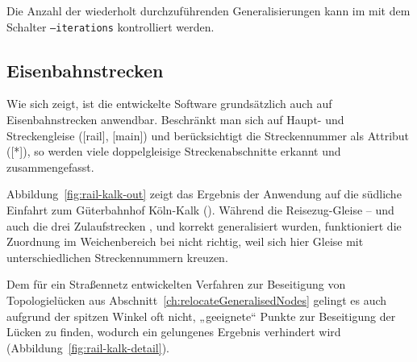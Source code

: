 \documentclass[../main/thesis.tex]{subfiles}
\begin{document}

Die Anzahl der wiederholt durchzuführenden Generalisierungen kann im  mit dem Schalter \texttt{--iterations} kontrolliert werden.




\subsection{Eisenbahnstrecken}
\label{ch:result-railways}

Wie sich zeigt, ist die entwickelte Software grundsätzlich auch auf Eisenbahnstrecken anwendbar.
Beschränkt man sich auf Haupt- und Streckengleise ([rail], [main]) und berücksichtigt die Streckennummer als Attribut ([*]), so werden viele doppelgleisige Streckenabschnitte erkannt und zusammengefasst.

Abbildung~\ref{fig:rail-kalk-out} zeigt das Ergebnis der Anwendung auf die südliche Einfahrt zum Güterbahnhof Köln-Kalk ().
Während die Reisezug-Gleise -- und auch die drei Zulaufstrecken ,  und  korrekt generalisiert wurden, funktioniert die Zuordnung im Weichenbereich bei  nicht richtig, weil sich hier Gleise mit unterschiedlichen Streckennummern kreuzen.

Dem für ein Straßennetz entwickelten Verfahren zur Beseitigung von Topologielücken aus Abschnitt~\ref{ch:relocateGeneralisedNodes} gelingt es auch aufgrund der spitzen Winkel oft nicht, „geeignete“ Punkte zur Beseitigung der Lücken zu finden, wodurch ein gelungenes Ergebnis verhindert wird (Abbildung~\ref{fig:rail-kalk-detail}).
\end{document}
